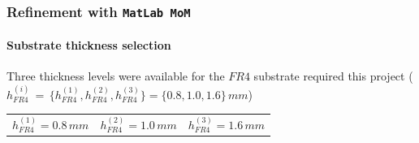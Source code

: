 \documentclass[12pt,a4paper]{article}
\begin{document}
{	\subsubsection*{\selectfont\color{Turquoise}Refinement with \texttt{\color{BurntOrange}MatLab MoM}}
	\paragraph{\selectfont\color{Turquoise}Substrate thickness selection}Three thickness levels were available for the $FR4$ substrate required this project ($h_{FR4}^{(i)}\,=\,\{h_{FR4}^{(1)},h_{FR4}^{(2)},h_{FR4}^{(3)}\}=\{0.8,1.0,1.6\}\,mm$)
	\begin{table}[h]
		\begin{center}
			{\selectfont
				\begin{tabular}{||m{3cm}|m{3cm}|m{3cm}||}
					\hline 
					\rowcolor{lightgray}\multicolumn{3}{|c|}{\textbf{FR4 substrate project thickness levels available}} 
					\\
					\hline
					\cellcolor{pink}$h_{FR4}^{(1)}=0.8\,mm$ & 
					\cellcolor{pink}$h_{FR4}^{(2)}=1.0\,mm$ & 
					\cellcolor{pink}$h_{FR4}^{(3)}=1.6\,mm$  \\
					\hline
					

\end{tabular}}
\end{center}
\end{table}}
\end{document}
